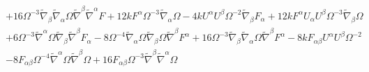 \documentclass[10pt,letterpaper]{article}
\numberwithin{equation}{section}
\begin{document}
\begin{eqnarray}
&& + 16 \Omega^{-3} \tilde{\nabla}_{\beta }\tilde{\nabla}_{\alpha }\Omega \tilde{\nabla}^{\beta }\tilde{\nabla}^{\alpha }F+12 k F^{\alpha } \Omega^{-3} \tilde{\nabla}_{\alpha }\Omega - 4 k U^{\alpha } U^{\beta } \Omega^{-2} \tilde{\nabla}_{\beta }F_{\alpha } + 12 k F^{\alpha } U_{\alpha } U^{\beta } \Omega^{-3} \tilde{\nabla}_{\beta }\Omega \nonumber \\ 
&& + 6 \Omega^{-3} \tilde{\nabla}^{\alpha }\Omega \tilde{\nabla}_{\beta }\tilde{\nabla}^{\beta }F_{\alpha } - 8 \Omega^{-4} \tilde{\nabla}_{\alpha }\Omega \tilde{\nabla}_{\beta }\Omega \tilde{\nabla}^{\beta }F^{\alpha } + 16 \Omega^{-3} \tilde{\nabla}_{\beta }\tilde{\nabla}_{\alpha }\Omega \tilde{\nabla}^{\beta }F^{\alpha }-8 k F_{\alpha \beta } U^{\alpha } U^{\beta } \Omega^{-2} \nonumber \\ 
&& - 8 F_{\alpha \beta } \Omega^{-4} \tilde{\nabla}^{\alpha }\Omega \tilde{\nabla}^{\beta }\Omega + 16 F_{\alpha \beta } \Omega^{-3} \tilde{\nabla}^{\beta }\tilde{\nabla}^{\alpha }\Omega 
\end{eqnarray}

\end{document}
